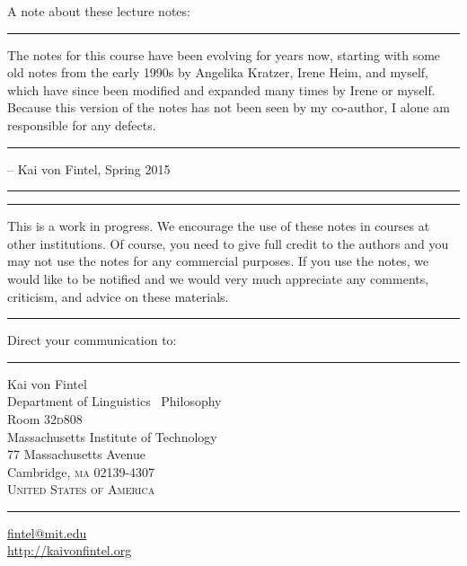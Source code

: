 \frontmatter

\title{}
\author{\and{}} 
\date{}

\pagestyle{empty}

\maketitle

\clearpage

\null
\vfill \ba 

A note about these lecture notes:

\plainbreak{1} 

The notes for this course have been evolving for years now, starting
with some old notes from the early 1990s by Angelika Kratzer, Irene
Heim, and myself, which have since been modified and expanded many
times by Irene or myself. Because this version of the notes has not
been seen by my co-author, I alone am responsible for any defects.

\plainbreak{1} 

-- Kai von Fintel, Spring 2015

\plainbreak{1}\plainbreak{1}

This is a work in progress. We encourage the use of these notes in
courses at other institutions. Of course, you need to give full credit
to the authors and you may not use the notes for any commercial
purposes. If you use the notes, we would like to be notified and we
would very much appreciate any comments, criticism, and advice on
these materials. 

\plainbreak{1}

Direct your communication to: 

\plainbreak{1} 

Kai von Fintel\\
Department of Linguistics \amp\ Philosophy\\
Room 32\textperiodcentered{}\textsc{d}808\\
Massachusetts Institute of Technology\\
77 Massachusetts Avenue\\
Cambridge, \textsc{ma} 02139-4307\\
\textsc{United States of America} 

\plainbreak{1}

\href{mailto:fintel@mit.edu}{fintel@mit.edu}\\
\url{http://kaivonfintel.org} 

